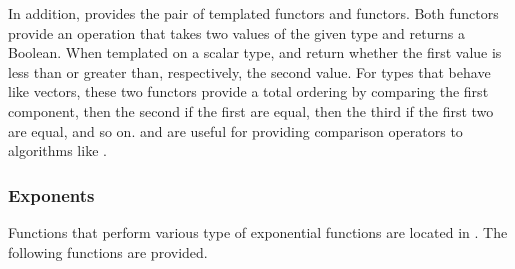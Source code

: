 In addition,  provides the pair of templated
functors  and  functors. Both
functors provide an operation that takes two values of the given type and
returns a Boolean. When templated on a scalar type,
 and  return whether
the first value is less than or greater than, respectively, the second
value. For types that behave like vectors, these two functors provide a
total ordering by comparing the first component, then the second if the
first are equal, then the third if the first two are equal, and so
on.  and  are useful
for providing comparison operators to algorithms like .

\subsubsection{Exponents}

Functions that perform various type of exponential functions are located in
. The following functions are provided.

